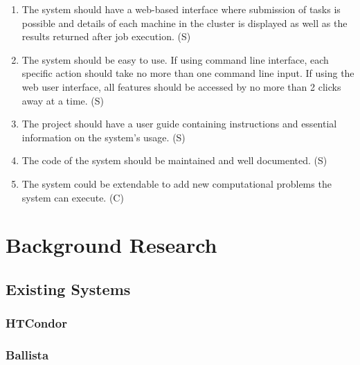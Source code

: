 \documentclass[10pt]{report}
\begin{document}
\begin{enumerate}
    \item The system should have a web-based interface where submission of tasks is possible and details of each machine in the cluster is displayed as well as the results returned after job execution. (S)
    \item The system should be easy to use. If using command line interface, each specific action should take no more than one command line input. If using the web user interface, all features should be accessed by no more than 2 clicks away at a time. (S)
    \item The project should have a user guide containing instructions and essential information on the system's usage. (S)
    \item The code of the system should be maintained and well documented. (S)
    \item The system could be extendable to add new computational problems the system can execute. (C)

\end{enumerate}


\chapter{Background Research} \label{background}

\section{Existing Systems} \label{existing}

\subsection{HTCondor} \label{htc}

\subsection{Ballista}



\end{document}
